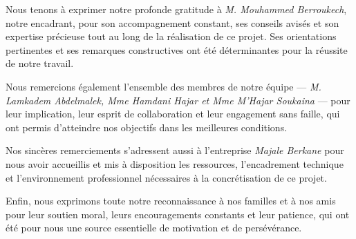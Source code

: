 

Nous tenons à exprimer notre profonde gratitude à \textit{M. Mouhammed Berroukech}, notre encadrant, pour son accompagnement constant, ses conseils avisés et son expertise précieuse tout au long de la réalisation de ce projet. Ses orientations pertinentes et ses remarques constructives ont été déterminantes pour la réussite de notre travail.

Nous remercions également l’ensemble des membres de notre équipe — \textit{M. Lamkadem Abdelmalek, Mme Hamdani Hajar et Mme M’Hajar Soukaina} — pour leur implication, leur esprit de collaboration et leur engagement sans faille, qui ont permis d’atteindre nos objectifs dans les meilleures conditions.

Nos sincères remerciements s’adressent aussi à l’entreprise \textit{Majale Berkane} pour nous avoir accueillis et mis à disposition les ressources, l’encadrement technique et l’environnement professionnel nécessaires à la concrétisation de ce projet.

Enfin, nous exprimons toute notre reconnaissance à nos familles et à nos amis pour leur soutien moral, leurs encouragements constants et leur patience, qui ont été pour nous une source essentielle de motivation et de persévérance.

\MediaOptionLogicBlank